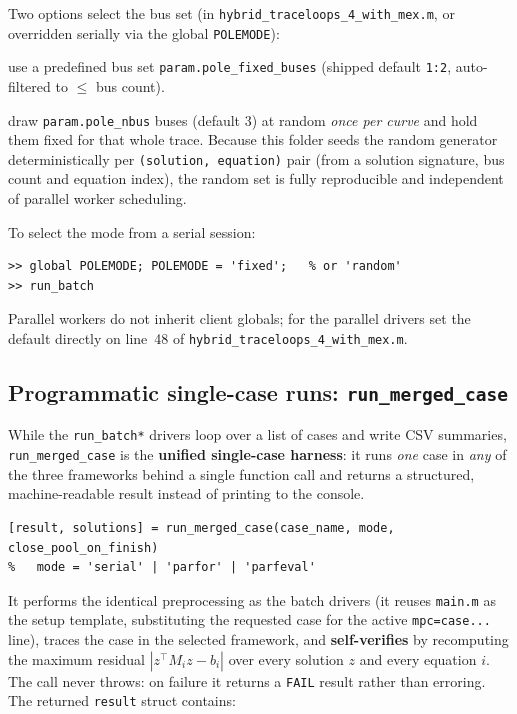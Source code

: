 \documentclass[11pt,a4paper]{article}
\newcommand{\code}[1]{\texttt{#1}}
\begin{document}
Two options select the bus set (in \code{hybrid_traceloops_4_with_mex.m}, or overridden
serially via the global \code{POLEMODE}):

\begin{description}[leftmargin=0em,style=nextline]
\item[\code{'fixed'} (option 1)] use a predefined bus set \code{param.pole_fixed_buses}
      (shipped default \code{1:2}, auto-filtered to $\le$ bus count).
\item[\code{'random'} (option 2, shipped default)] draw \code{param.pole_nbus} buses
      (default 3) at random \emph{once per curve} and hold them fixed for that whole
      trace. Because this folder seeds the random generator deterministically per
      \code{(solution, equation)} pair (from a solution signature, bus count and equation
      index), the random set is fully reproducible and independent of parallel worker
      scheduling.
\end{description}

To select the mode from a serial session:
\begin{lstlisting}[style=mat]
>> global POLEMODE; POLEMODE = 'fixed';   % or 'random'
>> run_batch
\end{lstlisting}
Parallel workers do not inherit client globals; for the parallel drivers set the default
directly on line~48 of \code{hybrid_traceloops_4_with_mex.m}.

\subsection{Programmatic single-case runs: \code{run_merged_case}}
While the \code{run_batch*} drivers loop over a list of cases and write CSV summaries,
\code{run_merged_case} is the \textbf{unified single-case harness}: it runs \emph{one}
case in \emph{any} of the three frameworks behind a single function call and returns a
structured, machine-readable result instead of printing to the console.
\begin{lstlisting}[style=mat]
[result, solutions] = run_merged_case(case_name, mode, close_pool_on_finish)
%   mode = 'serial' | 'parfor' | 'parfeval'
\end{lstlisting}
It performs the identical preprocessing as the batch drivers (it reuses \code{main.m} as
the setup template, substituting the requested case for the active \code{mpc=case...}
line), traces the case in the selected framework, and \textbf{self-verifies} by
recomputing the maximum residual $|z^\top M_i z - b_i|$ over every solution $z$ and every
equation $i$. The call never throws: on failure it returns a \code{FAIL} result rather
than erroring. The returned \code{result} struct contains:
\end{document}
